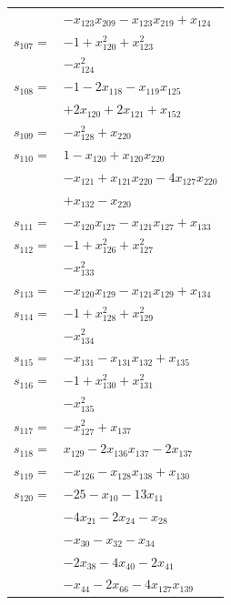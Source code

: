 \begin{longtable}{@{}r@{\;}l@{}}
 & \(\displaystyle -x_{123}x_{209} -x_{123}x_{219} +x_{124}\) \\[3pt]
\(s_{107}=\) & \(\displaystyle -1 +x_{120}^{2} +x_{123}^{2}\) \\
 & \(\displaystyle -x_{124}^{2}\) \\[3pt]
\(s_{108}=\) & \(\displaystyle -1 -2x_{118} -x_{119}x_{125}\) \\
 & \(\displaystyle +2x_{120} +2x_{121} +x_{152}\) \\[3pt]
\(s_{109}=\) & \(\displaystyle -x_{128}^{2} +x_{220}\) \\[3pt]
\(s_{110}=\) & \(\displaystyle 1 -x_{120} +x_{120}x_{220}\) \\
 & \(\displaystyle -x_{121} +x_{121}x_{220} -4x_{127}x_{220}\) \\
 & \(\displaystyle +x_{132} -x_{220}\) \\[3pt]
\(s_{111}=\) & \(\displaystyle -x_{120}x_{127} -x_{121}x_{127} +x_{133}\) \\[3pt]
\(s_{112}=\) & \(\displaystyle -1 +x_{126}^{2} +x_{127}^{2}\) \\
 & \(\displaystyle -x_{133}^{2}\) \\[3pt]
\(s_{113}=\) & \(\displaystyle -x_{120}x_{129} -x_{121}x_{129} +x_{134}\) \\[3pt]
\(s_{114}=\) & \(\displaystyle -1 +x_{128}^{2} +x_{129}^{2}\) \\
 & \(\displaystyle -x_{134}^{2}\) \\[3pt]
\(s_{115}=\) & \(\displaystyle -x_{131} -x_{131}x_{132} +x_{135}\) \\[3pt]
\(s_{116}=\) & \(\displaystyle -1 +x_{130}^{2} +x_{131}^{2}\) \\
 & \(\displaystyle -x_{135}^{2}\) \\[3pt]
\(s_{117}=\) & \(\displaystyle -x_{127}^{2} +x_{137}\) \\[3pt]
\(s_{118}=\) & \(\displaystyle x_{129} -2x_{136}x_{137} -2x_{137}\) \\[3pt]
\(s_{119}=\) & \(\displaystyle -x_{126} -x_{128}x_{138} +x_{130}\) \\[3pt]
\(s_{120}=\) & \(\displaystyle -25 -x_{10} -13x_{11}\) \\
 & \(\displaystyle -4x_{21} -2x_{24} -x_{28}\) \\
 & \(\displaystyle -x_{30} -x_{32} -x_{34}\) \\
 & \(\displaystyle -2x_{38} -4x_{40} -2x_{41}\) \\
 & \(\displaystyle -x_{44} -2x_{66} -4x_{127}x_{139}\) \\

\end{longtable}
